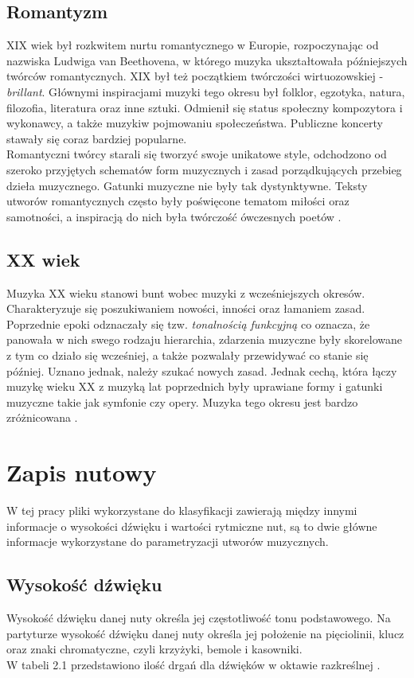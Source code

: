 \documentclass[printmode, eng, openany]{mgr}
\newcommand\tab[1][1cm]{\hspace*{#1}}
\begin{document}
\subsection{Romantyzm}
\tab XIX wiek był rozkwitem nurtu romantycznego w Europie, rozpoczynając od nazwiska Ludwiga van Beethovena, w którego muzyka ukształtowała późniejszych twórców romantycznych. XIX był też początkiem twórczości wirtuozowskiej - \textit{brillant}. Głównymi inspiracjami muzyki tego okresu był folklor, egzotyka, natura, filozofia, literatura oraz inne sztuki. Odmienił się status społeczny kompozytora i wykonawcy, a także muzyki\linebreak w pojmowaniu społeczeństwa. Publiczne koncerty stawały się coraz bardziej popularne.\\
\tab Romantyczni twórcy starali się tworzyć swoje unikatowe style, odchodzono od szeroko przyjętych schematów form muzycznych i zasad porządkujących przebieg dzieła muzycznego. Gatunki muzyczne nie były tak dystynktywne. Teksty utworów romantycznych często były poświęcone tematom miłości oraz samotności, a inspiracją do nich była twórczość ówczesnych poetów \cite{rom}.
\subsection{XX wiek}
\tab Muzyka XX wieku stanowi bunt wobec muzyki z wcześniejszych okresów. Charakteryzuje się poszukiwaniem nowości, inności oraz łamaniem zasad. Poprzednie epoki odznaczały się tzw. \textit{tonalnością funkcyjną} co oznacza, że panowała w nich swego rodzaju hierarchia, zdarzenia muzyczne były skorelowane z tym co działo się wcześniej, a także pozwalały przewidywać co stanie się później. Uznano jednak, należy szukać nowych zasad. Jednak cechą, która łączy muzykę wieku XX z muzyką lat poprzednich były uprawiane formy i gatunki muzyczne takie jak symfonie czy opery. Muzyka tego okresu jest bardzo zróżnicowana \cite{xx}. 
\section{Zapis nutowy}
\tab W tej pracy pliki wykorzystane do klasyfikacji zawierają między innymi informacje o wysokości dźwięku i wartości rytmiczne nut, są to dwie główne informacje wykorzystane do parametryzacji utworów muzycznych.
\subsection{Wysokość dźwięku}
\tab Wysokość dźwięku danej nuty określa jej częstotliwość tonu podstawowego. Na partyturze wysokość dźwięku danej nuty określa jej położenie na pięciolinii, klucz oraz znaki chromatyczne, czyli krzyżyki, bemole i kasowniki.\\ W tabeli 2.1 przedstawiono ilość drgań dla dźwięków w oktawie razkreślnej \cite{wys}. 
\end{document}
